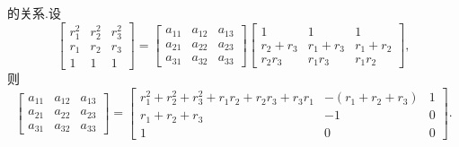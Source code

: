 \documentclass[a4paper]{article}
\begin{document}
的关系.设
\begin{equation}
  \label{eq:11.06}
  \begin{bmatrix}
      r_1^2&r_2^2&r_3^2\\
r_1&r_2&r_3\\
1&1&1
  \end{bmatrix}=\begin{bmatrix}
    a_{11}&a_{12}&a_{13}\\
a_{21}&a_{22}&a_{23}\\
a_{31}&a_{32}&a_{33}
  \end{bmatrix}\begin{bmatrix}
          1&1&1\\
r_2+r_3&r_1+r_3&r_1+r_2\\
r_2r_3&r_1r_3&r_1r_2
  \end{bmatrix},
\end{equation}
则
$$
\begin{bmatrix}
  a_{11}&a_{12}&a_{13}\\
a_{21}&a_{22}&a_{23}\\
a_{31}&a_{32}&a_{33}
\end{bmatrix}=\begin{bmatrix}
 r_1^2+r_2^2+r_3^2+r_1r_2+r_2r_3+r_3r_1&-(r_1+r_2+r_3)&1\\
r_1+r_2+r_3&-1&0\\
1&0&0
\end{bmatrix}.
$$
\end{document}

